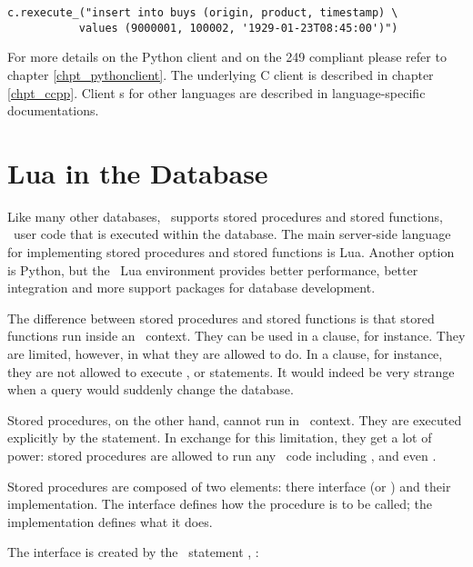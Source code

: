 \begin{minipage}{\textwidth}
\begin{python}
\begin{lstlisting}
c.rexecute_("insert into buys (origin, product, timestamp) \
           values (9000001, 100002, '1929-01-23T08:45:00')")
\end{lstlisting}
\end{python}
\end{minipage}

For more details on the Python client
and on the  249 compliant 
please refer to chapter \ref{chpt_pythonclient}.
The underlying C client \acronym{api} is described in
chapter \ref{chpt_ccpp}.
Client s for other languages are described
in language-specific documentations.

\section{Lua in the Database}
Like many other databases,
\nowdb\ supports
stored procedures and stored functions,
\ie\ user code that is executed within the database.
The main server-side language
for implementing stored procedures and
stored functions is Lua.
Another option is Python,
but the \nowdb\ Lua environment
provides better performance,
better integration and more support
packages for database development.

The difference between stored procedures
and stored functions is that stored functions
run inside an \sql\ context. They
can be used in a  clause,
for instance. They are limited, however,
in what they are allowed to do.
In a  clause, for instance,
they are not allowed to
execute ,  or 
statements.
It would indeed be very strange when
a query would suddenly change the database.

Stored procedures, on the other hand,
cannot run in \sql\ context. They are
executed explicitly by the 
statement. In exchange for this limitation,
they get a lot of power:
stored procedures are allowed to run
any \sql\ code including , 
and even .

Stored procedures are composed of two
elements: there interface (or )
and their implementation.
The interface defines how the procedure is
to be called; the implementation defines
what it does.

The interface is created by the \sql\ statement
, \eg:

